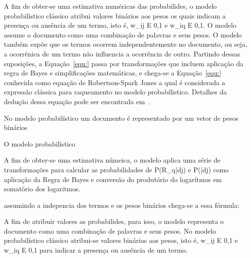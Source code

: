 












A fim de obter-se uma estimativa numéricas das probabilides, o modelo probabilístico clássico atribui valores binários aos pesos os quais indicam a presença ou ausência de um termo, isto é, w_ij E {0,1} e w_iq E {0,1}. 
O modelo assume o documento como uma combinação de palavras e seus pesos. 
O modelo também supõe que os termos ocorrem independentemente no documento, ou seja, a ocorrênica de um termo não influencia a ocorrência de outro. 
Partindo dessas suposições, a Equação~\ref{equ:} passa por transformações que incluem aplicação da regra de Bayes e simplificações matemáticas, e chega-se a Equação~\ref{equ:} conhecida como equação de Robertson-Spark Jones a qual é considerada a expressão clássica para raqueamento no modelo probabílistico. Detalhes da dedução dessa equação pode ser encontrada em~\cite{}.





No modelo probabilístico um documento é representado por um vetor de pesos binários 



O modelo probabilístico

A fim de obter-se uma estimativa númeica, o modelo aplica uma série de transformações para calcular as probabilidades de P(R_q|dj) e P(|dj) como 
aplicação da Regra de Bayes 
e conversão do produtório do logarítmos em somatório dos logaritmos.




assumindo a indepencia dos termos e os pesos binários chega-se a essa fórmula:



A fim de atribuir valores as probabilides, para isso, o modelo representa o documento como uma combinação de palavras e seus pesos. No modelo probabilístico clássico atribui-se valores binários aos pesos, isto é, w_ij E {0,1} e w_iq E {0,1} para indicar a presença ou ausência de um termo.















